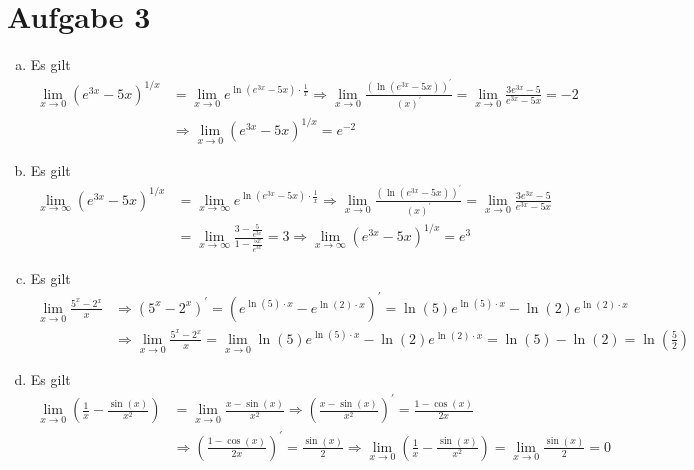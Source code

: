 \documentclass{article}
\begin{document}
	\section*{Aufgabe 3}
	\begin{enumerate}[(a)]
		\item Es gilt
		\begin{align*}
			 \lim\limits_{x \rightarrow 0} \left(e^{3x}-5x\right)^{1/x} &= \lim\limits_{x \rightarrow 0}e^{\ln(e^{3x}-5x)\cdot\frac{1}{x}} \Longrightarrow \lim\limits_{x \rightarrow 0}\frac{(\ln(e^{3x}-5x))^{'}}{(x)^{'}}=\lim\limits_{x \rightarrow 0} \frac{3e^{3x}-5}{e^{3x}-5x} = -2\\ 
			 &\Longrightarrow \lim\limits_{x \rightarrow 0} \left(e^{3x}-5x\right)^{1/x} = e^{-2}
		\end{align*}
		\item Es gilt 
		\begin{align*}
			\lim\limits_{x \rightarrow \infty}\left(e^{3x}-5x\right)^{1/x}&= \lim\limits_{x \rightarrow \infty}e^{\ln(e^{3x}-5x)\cdot\frac{1}{x}} \Longrightarrow \lim\limits_{x \rightarrow 0}\frac{(\ln(e^{3x}-5x))^{'}}{(x)^{'}}=\lim\limits_{x \rightarrow 0} \frac{3e^{3x}-5}{e^{3x}-5x}\\
			&= \lim\limits_{x \rightarrow \infty}\frac{3-\frac{5}{e^{3x}}}{1-\frac{5x}{e^{3x}}}= 3 \Longrightarrow \lim\limits_{x \rightarrow \infty}\left(e^{3x}-5x\right)^{1/x} = e^3
		\end{align*}
		\item Es gilt 
		\begin{align*}
			\lim\limits_{x \rightarrow 0} \frac{5^x-2^x}{x} & \Longrightarrow (5^x-2^x)^{'}
			=(e^{\ln(5)\cdot x}- e^{\ln(2)\cdot x})^{'}= \ln(5)e^{\ln(5)\cdot x}-\ln(2)e^{\ln(2)\cdot x}\\ &\Longrightarrow \lim\limits_{x \rightarrow 0} \frac{5^x-2^x}{x} = \lim\limits_{x \rightarrow 0}\ln(5)e^{\ln(5)\cdot x}-\ln(2)e^{\ln(2)\cdot x}= \ln(5)-\ln(2)=\ln(\frac{5}{2})
		\end{align*}
	\item Es gilt
	\begin{align*}
		\lim\limits_{x \rightarrow 0}\left(\frac{1}{x}-\frac{\sin(x)}{x^2}\right) &= \lim\limits_{x \rightarrow 0}\frac{x-\sin(x)}{x^2}\Longrightarrow \left(\frac{x-\sin(x)}{x^2}\right)^{'}= \frac{1-\cos(x)}{2x}\\ &\Longrightarrow \left(\frac{1-\cos(x)}{2x}\right)^{'}= \frac{\sin(x)}{2} \Longrightarrow \lim\limits_{x \rightarrow 0}\left(\frac{1}{x}-\frac{\sin(x)}{x^2}\right) = \lim\limits_{x \rightarrow 0} \frac{\sin(x)}{2}=0

\end{align*}
\end{enumerate}
\end{document}
